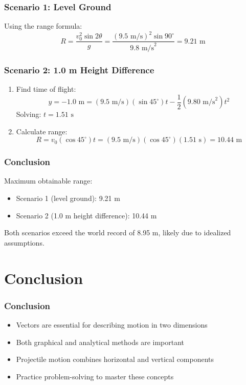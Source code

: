 \documentclass{beamer}
\begin{document}
\begin{frame}
\frametitle{Scenario 1: Level Ground}
Using the range formula:
\[
R = \frac{v_0^2 \sin 2\theta}{g} = \frac{(9.5 \text{ m/s})^2 \sin 90^\circ}{9.8 \text{ m/s}^2} = 9.21 \text{ m}
\]
\end{frame}

\begin{frame}
\frametitle{Scenario 2: 1.0 m Height Difference}
\begin{enumerate}
\item Find time of flight:
\[
y = -1.0 \text{ m} = (9.5 \text{ m/s})(\sin 45^\circ)t - \frac{1}{2}(9.80 \text{ m/s}^2)t^2
\]
Solving: $t = 1.51 \text{ s}$
\item Calculate range:
\[
R = v_0 (\cos 45^\circ) t = (9.5 \text{ m/s})(\cos 45^\circ)(1.51 \text{ s}) = 10.44 \text{ m}
\]
\end{enumerate}
\end{frame}

\begin{frame}
\frametitle{Conclusion}
Maximum obtainable range:
\begin{itemize}
\item Scenario 1 (level ground): 9.21 m
\item Scenario 2 (1.0 m height difference): 10.44 m
\end{itemize}
Both scenarios exceed the world record of 8.95 m, likely due to idealized assumptions.
\end{frame}
\section{Conclusion}

\begin{frame}
\frametitle{Conclusion}
\begin{itemize}[<+->]
\item Vectors are essential for describing motion in two dimensions
\item Both graphical and analytical methods are important
\item Projectile motion combines horizontal and vertical components
\item Practice problem-solving to master these concepts
\end{itemize}
\end{frame}
\end{document}
